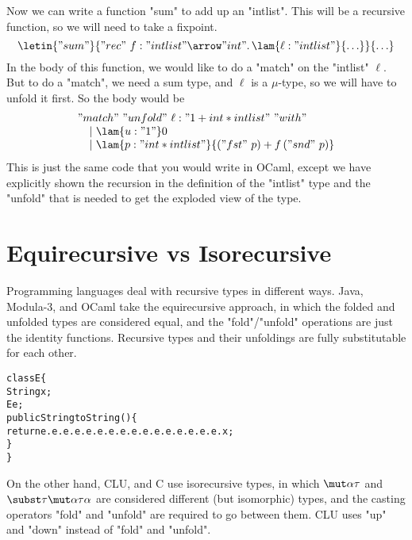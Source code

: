 Now we can write a function "sum" to add up an "intlist". This will be a recursive function, so we will need to take a fixpoint.
\[
\letin{"sum"}{"rec"~f : "intlist" \arrow "int" .\, \lam{\ell : "intlist"}{\ldots}}{\ldots}
\]
In the body of this function, we would like to do a "match" on the "intlist" $\ell$. But to do a "match", we need a sum type, and $\ell$ is a $\mu$-type, so we will have to unfold it first. So the body would be
\[
\begin{array}l
"match"~"unfold"~\ell:"1 + int * intlist"~"with"\\
\phantom{dd}|\ \lam{u:"1"}0\\
\phantom{dd}|\ \lam{p:"int * intlist"}{("fst"~p) + f\,("snd"~p)}
\end{array}
\]
This is just the same code that you would write in OCaml, except we have explicitly shown the recursion in the definition of the "intlist" type and the "unfold" that is needed to get the exploded view of the type.

\section{Equirecursive vs Isorecursive}

Programming languages deal with recursive types in different ways. Java, Modula-3, and OCaml take the equirecursive approach, in which the folded and unfolded types are considered equal, and the "fold"/"unfold" operations are just the identity functions. Recursive types and their unfoldings are fully substitutable for each other. 
\begin{small}
\begin{alltt}
   class E \{
     String x;
     E e;
     public String toString() \{
       return e.e.e.e.e.e.e.e.e.e.e.e.e.e.e.e.x;
     \}
   \}
\end{alltt}
\end{small}
On the other hand, CLU, and C use isorecursive types, in which $\mut\alpha\tau$ and $\subst\tau{\mut\alpha\tau}\alpha$ are considered different (but isomorphic) types, and the casting operators "fold" and "unfold" are required to go between them. CLU uses "up" and "down" instead of "fold" and "unfold".

